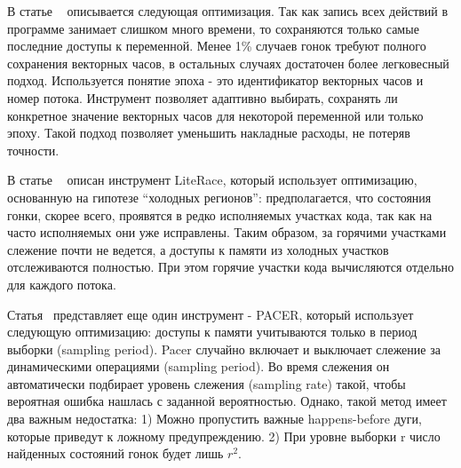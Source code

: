 В статье ~\cite{Flanagan:2009:PLDI, Flanagan:2009} описывается следующая оптимизация.
Так как запись всех действий в программе занимает слишком много времени, то сохраняются только самые последние доступы к переменной.
Менее 1\% случаев гонок требуют полного сохранения векторных часов, в остальных случаях достаточен более легковесный подход.
Используется понятие эпоха - это идентификатор векторных часов и номер потока.
Инструмент позволяет адаптивно выбирать, сохранять ли конкретное значение векторных часов для некоторой переменной или только эпоху.
Такой подход позволяет уменьшить накладные расходы, не потеряв точности.  

В статье ~\cite{Marino:2009:PLDI, Marino:2009} описан инструмент LiteRace, который использует оптимизацию, основанную на гипотезе “холодных регионов”: предполагается, что состояния гонки, скорее всего, проявятся в редко исполняемых участках кода, так как на часто исполняемых они уже исправлены.
Таким образом, за горячими участками слежение почти не ведется, а доступы к памяти из холодных участков отслеживаются полностью.
При этом горячие участки кода вычисляются отдельно для каждого потока.

Статья~\cite{Bond:2010:PLDI,Bond:2010} представляет еще один инструмент - PACER, который использует следующую оптимизацию: доступы к памяти учитываются только в период выборки (sampling period).
Pacer случайно включает и выключает слежение за динамическими операциями (sampling period).
Во время слежения он автоматически подбирает уровень слежения (sampling rate) такой, чтобы вероятная ошибка нашлась с заданной вероятностью.
Однако, такой метод имеет два важным недостатка:
1) Можно пропустить важные happens-before дуги, которые приведут к ложному предупреждению.
2) При уровне выборки r число найденных состояний гонок будет лишь $r^2$. 

